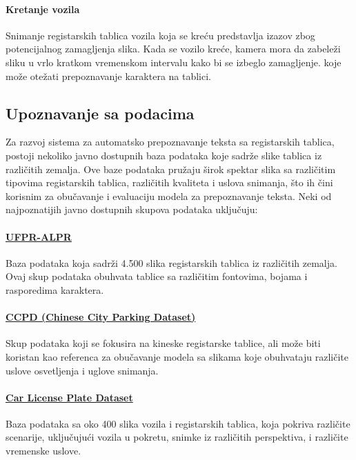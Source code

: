 \documentclass[a4paper,12pt]{article}
\begin{document}
	\paragraph{Kretanje vozila}
	Snimanje registarskih tablica vozila koja se kreću predstavlja izazov zbog potencijalnog zamagljenja slika. Kada se vozilo kreće, kamera mora da zabeleži sliku u vrlo kratkom vremenskom intervalu kako bi se izbeglo zamagljenje. koje može otežati prepoznavanje karaktera na tablici.
	
	\subsection{Upoznavanje sa podacima}
	Za razvoj sistema za automatsko prepoznavanje teksta sa registarskih tablica, postoji nekoliko javno dostupnih baza podataka koje sadrže slike tablica iz različitih zemalja. Ove baze podataka pružaju širok spektar slika sa različitim tipovima registarskih tablica, različitih kvaliteta i uslova snimanja, što ih čini korisnim za obučavanje i evaluaciju modela za prepoznavanje teksta. Neki od najpoznatijih javno dostupnih skupova podataka uključuju:
		
	\paragraph{\href{https://github.com/raysonlaroca/ufpr-alpr-dataset}{UFPR-ALPR}}
	Baza podataka koja sadrži 4.500 slika registarskih tablica iz različitih zemalja. Ovaj skup podataka obuhvata tablice sa različitim fontovima, bojama i rasporedima karaktera.
	
	\paragraph{\href{https://github.com/detectRecog/CCPD}{CCPD (Chinese City Parking Dataset)}}
	Skup podataka koji se fokusira na kineske registarske tablice, ali može biti koristan kao referenca za obučavanje modela sa slikama koje obuhvataju različite uslove osvetljenja i uglove snimanja.
	
	\paragraph{\href{https://datasetninja.com/car-license-plate}{Car License Plate Dataset}}
	Baza podataka sa oko 400 slika vozila i registarskih tablica, koja pokriva različite scenarije, uključujući vozila u pokretu, snimke iz različitih perspektiva, i različite vremenske uslove. \newline
	
\end{document}
